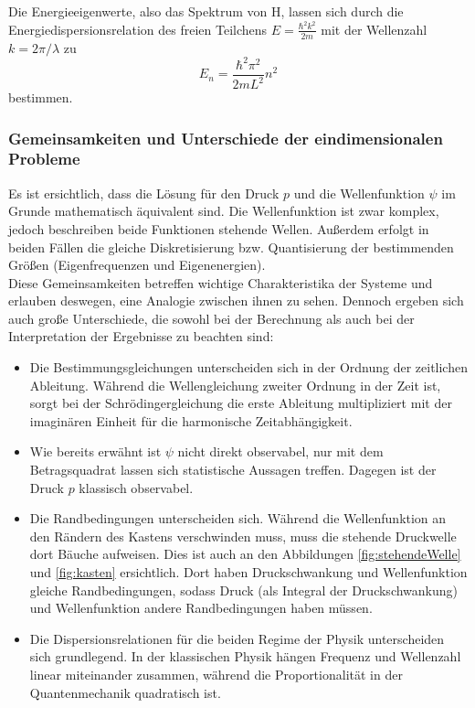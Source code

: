 
Die Energieeigenwerte, also das Spektrum von H, lassen sich durch die Energiedispersionsrelation des freien Teilchens $E = \frac{\hbar^2 k^2}{2m}$ mit der Wellenzahl $k = 2 \pi / \lambda$ zu
\begin{equation}
  E_n = \frac{\hbar^2 \pi^2}{2 m L^2} n^2
  \label{eqn:kastenEnergien}
\end{equation}
bestimmen.

\subsubsection{Gemeinsamkeiten und Unterschiede der eindimensionalen Probleme}
Es ist ersichtlich, dass die Lösung für den Druck $p$ und die Wellenfunktion $\psi$ im Grunde mathematisch äquivalent sind. Die Wellenfunktion ist zwar komplex, jedoch beschreiben beide Funktionen stehende Wellen. Außerdem erfolgt in beiden Fällen die gleiche Diskretisierung bzw. Quantisierung der bestimmenden Größen (Eigenfrequenzen und Eigenenergien).\\
Diese Gemeinsamkeiten betreffen wichtige Charakteristika der Systeme und erlauben deswegen, eine Analogie zwischen ihnen zu sehen. Dennoch ergeben sich auch große Unterschiede, die sowohl bei der Berechnung als auch bei der Interpretation der Ergebnisse zu beachten sind:
\begin{itemize}
  \item Die Bestimmungsgleichungen unterscheiden sich in der Ordnung der zeitlichen Ableitung. Während die Wellengleichung zweiter Ordnung in der Zeit ist, sorgt bei der Schrödingergleichung die erste Ableitung multipliziert mit der imaginären Einheit für die harmonische Zeitabhängigkeit.
  \item Wie bereits erwähnt ist $\psi$ nicht direkt observabel, nur mit dem Betragsquadrat lassen sich statistische Aussagen treffen. Dagegen ist der Druck $p$ klassisch observabel.
  \item Die Randbedingungen unterscheiden sich. Während die Wellenfunktion an den Rändern des Kastens verschwinden muss, muss die stehende Druckwelle dort Bäuche aufweisen. Dies ist auch an den Abbildungen \ref{fig:stehendeWelle} und \ref{fig:kasten} ersichtlich. Dort haben Druckschwankung und Wellenfunktion gleiche Randbedingungen, sodass Druck (als Integral der Druckschwankung) und Wellenfunktion andere Randbedingungen haben müssen.
  \item Die Dispersionsrelationen für die beiden Regime der Physik unterscheiden sich grundlegend. In der klassischen Physik hängen Frequenz und Wellenzahl linear miteinander zusammen, während die Proportionalität in der Quantenmechanik quadratisch ist.
\end{itemize}

